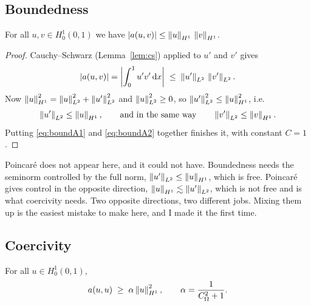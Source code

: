 \documentclass[11pt,a4paper]{article}
\begin{document}
\subsection{Boundedness}

\begin{proposition}\label{prop:boundA}
For all $u,v \in H^1_0(0,1)$ we have $\left\lvert a(u,v) \right\rvert \le \left\lVert u \right\rVert_{H^{1}}\,\left\lVert v \right\rVert_{H^{1}}$.
\end{proposition}

\begin{proof}
Cauchy--Schwarz (Lemma~\ref{lem:cs}) applied to $u'$ and $v'$ gives
\begin{equation}\label{eq:boundA1}
  \left\lvert a(u,v) \right\rvert = \left\lvert \int_0^1 u'v' \,\mathrm{d}x \right\rvert \;\le\; \left\lVert u' \right\rVert_{L^{2}}\,\left\lVert v' \right\rVert_{L^{2}} .
\end{equation}
Now $\left\lVert u \right\rVert_{H^{1}}^{2} = \left\lVert u \right\rVert_{L^{2}}^{2} + \left\lVert u' \right\rVert_{L^{2}}^{2}$ and $\left\lVert u \right\rVert_{L^{2}}^{2} \ge 0$,
so $\left\lVert u' \right\rVert_{L^{2}}^{2} \le \left\lVert u \right\rVert_{H^{1}}^{2}$, i.e.
\begin{equation}\label{eq:boundA2}
  \left\lVert u' \right\rVert_{L^{2}} \le \left\lVert u \right\rVert_{H^{1}},
  \qquad \text{and in the same way} \qquad
  \left\lVert v' \right\rVert_{L^{2}} \le \left\lVert v \right\rVert_{H^{1}}.
\end{equation}
Putting \eqref{eq:boundA1} and \eqref{eq:boundA2} together finishes it, with
constant $C=1$.
\end{proof}

\begin{remark}
Poincar\'e does not appear here, and it could not have. Boundedness needs the
seminorm controlled by the full norm, $\left\lVert u' \right\rVert_{L^{2}} \le \left\lVert u \right\rVert_{H^{1}}$, which is free.
Poincar\'e gives control in the opposite direction, $\left\lVert u \right\rVert_{H^{1}} \lesssim
\left\lVert u' \right\rVert_{L^{2}}$, which is not free and is what coercivity needs. Two opposite
directions, two different jobs. Mixing them up is the easiest mistake to make
here, and I made it the first time.
\end{remark}

\subsection{Coercivity}

\begin{proposition}\label{prop:coercA}
For all $u \in H^1_0(0,1)$,
\[
  a(u,u) \;\ge\; \alpha \left\lVert u \right\rVert_{H^{1}}^{2},
  \qquad \alpha = \frac{1}{C_\Omega^{2}+1} .
\]
\end{proposition}
\end{document}
